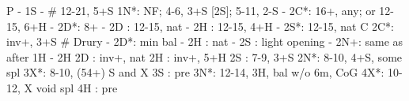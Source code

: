 P - 1S -  # 12-21, 5+S
1N*: NF; 4-6, 3+S [2S]; 5-11, 2-S
   - 2C*: 16+, any; or 12-15, 6+H
        - 2D*: 8+
   - 2D : 12-15, nat
   - 2H : 12-15, 4+H
   - 2S*: 12-15, nat C
2C*: inv+, 3+S  # Drury
   - 2D*: min bal
   - 2H : nat
   - 2S : light opening
   - 2N+: same as after 1H - 2H
2D : inv+, nat
2H : inv+, 5+H
2S : 7-9, 3+S
2N*: 8-10, 4+S, some spl
3X*: 8-10, (54+) S and X
3S : pre
3N*: 12-14, 3H, bal w/o 6m, CoG
4X*: 10-12, X void spl
4H : pre